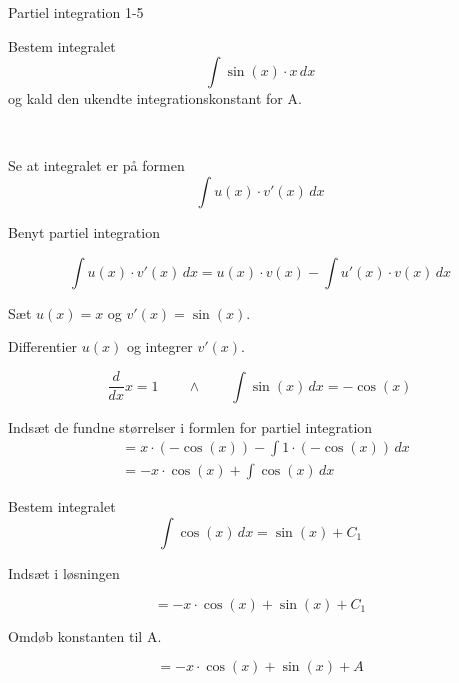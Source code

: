 \documentclass{article}
\begin{document}
\newpage

\begin{exercise}{Partiel integration 1-5}
	
	
	Bestem integralet
	\[
	\int \sin(x) \cdot x \, dx
	\]
	og kald den ukendte integrationskonstant for A.
	
	 \\
	
	
	\hint
	
	Se at integralet er på formen
	\[
	\int u(x) \cdot v'(x) \, dx
	\]
	
	\hint
	
	Benyt partiel integration
	
	\hint
	\[
	\int u(x) \cdot v'(x)\, dx = u(x) \cdot v(x) - \int u'(x) \cdot v(x) \, dx
	\]
	\hint
	
	Sæt $u(x) = x$ og $v'(x) = \sin(x)$.
	
	
	\hint
	
	Differentier $u(x)$ og integrer $v'(x)$.
	
	\hint
	\[
	\frac{d}{dx}x = 1 \qquad \wedge \qquad \int \sin(x) \, dx = -\cos(x)
	\]
	
	\hint
	
	Indsæt de fundne størrelser i formlen for partiel integration
	\begin{align*}
	&= x \cdot (-\cos(x))- \int 1 \cdot (-\cos(x)) \, dx\\ 
	&= -x \cdot \cos(x)+ \int \cos(x) \, dx 
	\end{align*}
	
	\hint
	
	Bestem integralet
	\[
	\int \cos(x) \, dx = \sin(x) + C_1
	\]
	
	\hint
	Indsæt i løsningen 
	
	\hint
	
	\[
	= -x \cdot \cos(x) + \sin(x) + C_1
	\]
	
	\hint
	
	Omdøb konstanten til A.
	
	\hint
	
	\[
	= -x \cdot \cos(x) + \sin(x) + A
	\]
	
	
\end{exercise}

\newpage
\end{document}
